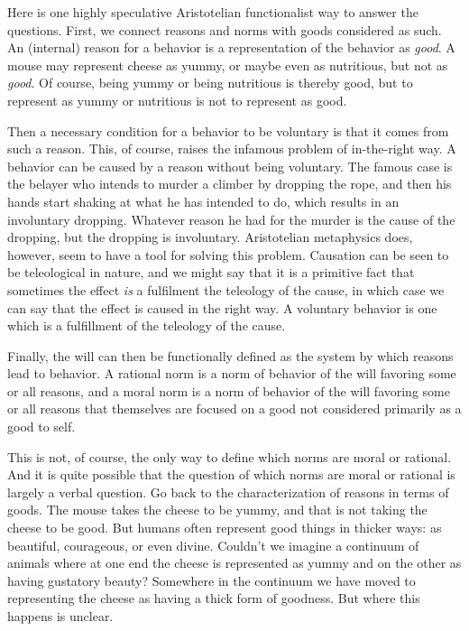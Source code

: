 Here is one highly speculative Aristotelian functionalist way to answer the questions. First, we connect reasons and norms with goods
considered as such. An (internal) reason 
for a behavior is a representation of the behavior as \textit{good}. A mouse may represent cheese as yummy, or maybe even as nutritious, 
but not as \textit{good}. Of course, being yummy or being nutritious is thereby good, but to represent as yummy or nutritious is not 
to represent as good. 

Then a necessary condition for a behavior to be voluntary is that it 
comes from such a reason. This, of course, raises the infamous problem of in-the-right way. A behavior can be caused by a reason
without being voluntary. The famous case is the belayer who intends to murder a climber by dropping the rope, and then
his hands start shaking at what he has intended to do, which results in an involuntary dropping. Whatever reason he had
for the murder is the cause of the dropping, but the dropping is involuntary. Aristotelian metaphysics does, however, seem
to have a tool for solving this problem. Causation can be seen to be teleological in nature, and we might say that it is 
a primitive fact that sometimes the effect \textit{is} a fulfilment the teleology of the cause, in which case we can say that the effect 
is caused in the right way. A voluntary behavior is one which is a fulfillment of the teleology of the cause.

Finally, the will can then be functionally defined as the system by which reasons lead to behavior. A rational norm is a norm of behavior
of the will favoring some or all reasons, and a moral norm is a norm of behavior of the will favoring some or all reasons that themselves 
are focused on  a good not considered primarily as a good to self. 

This is not, of course, the only way to define which norms are moral or rational. And it is quite possible that the question of which
norms are moral or rational is largely a verbal question. Go back to the characterization of reasons in terms of goods. The mouse takes
the cheese to be yummy, and that is not taking the cheese to be good. But humans often represent good things in thicker ways: as
beautiful, courageous, or even divine. Couldn't we imagine a continuum of animals where at one end the cheese is represented as 
yummy and on the other as having gustatory beauty? Somewhere in the continuum we have moved to representing the cheese as having a 
thick form of goodness. But where this happens is unclear. 

